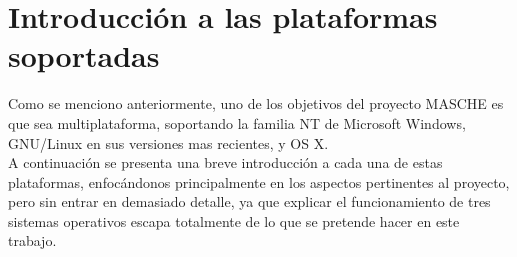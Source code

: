 \section{Introducción a las plataformas soportadas}

Como se menciono anteriormente, uno de los objetivos del proyecto MASCHE es que
sea multiplataforma, soportando la familia NT de Microsoft Windows, GNU/Linux
en sus versiones mas recientes, y OS X.\\

A continuación se presenta una breve introducción a cada una de estas
plataformas, enfocándonos principalmente en los aspectos pertinentes al
proyecto, pero sin entrar en demasiado detalle, ya que explicar el
funcionamiento de tres sistemas operativos escapa totalmente de lo que se
pretende hacer en este trabajo.\\

